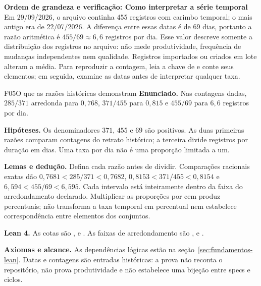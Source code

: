 \begin{resultado}
\textbf{Ordem de grandeza e verificação: Como interpretar a série temporal} Em 29/09/2026, o arquivo
 continha 455 registros com carimbo temporal; o mais
antigo era de 22/07/2026. A diferença entre essas datas é de 69 dias, portanto a
razão aritmética é $455/69 \approx 6{,}6$ registros por dia. Esse valor descreve
somente a distribuição dos registros no arquivo: não mede produtividade,
frequência de mudanças independentes nem qualidade. Registros importados ou
criados em lote alteram a média. Para reproduzir a contagem, leia a chave
 de  e conte seus elementos; em seguida,
examine as datas antes de interpretar qualquer taxa.
\end{resultado}

\begin{formalizacao}{F05}{O que as razões históricas demonstram}
\textbf{Enunciado.} Nas contagens dadas, $285/371$ arredonda para $0{,}768$, $371/455$ para $0{,}815$ e $455/69$ para $6{,}6$ registros por dia.

\textbf{Hipóteses.} Os denominadores $371$, $455$ e $69$ são positivos. As duas primeiras razões comparam contagens do retrato histórico; a terceira divide registros por duração em dias. Uma taxa por dia não é uma proporção limitada a um.

\textbf{Lemas e dedução.} Defina cada razão antes de dividir. Comparações racionais exatas dão $0{,}7681<285/371<0{,}7682$, $0{,}8153<371/455<0{,}8154$ e $6{,}594<455/69<6{,}595$. Cada intervalo está inteiramente dentro da faixa do arredondamento declarado. Multiplicar as proporções por cem produz percentuais; não transforma a taxa temporal em percentual nem estabelece correspondência entre elementos dos conjuntos.

\textbf{Lean 4.} As cotas são ,  e . As faixas de arredondamento são ,  e .

\textbf{Axiomas e alcance.} As dependências lógicas estão na seção~\ref{sec:fundamentos-lean}. Datas e contagens são entradas históricas: a prova não reconta o repositório, não prova produtividade e não estabelece uma bijeção entre specs e ciclos.
\end{formalizacao}

